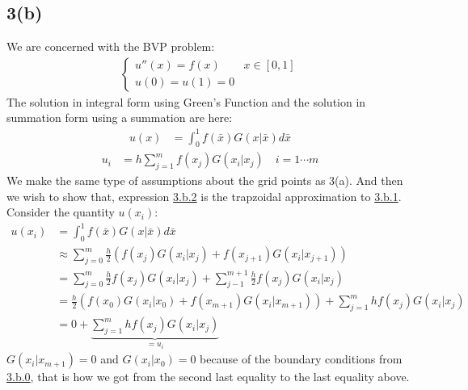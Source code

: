 \documentclass[]{article}
\begin{document}
    \subsection*{3(b)}
        We are concerned with the BVP problem: 
        \begin{align*}\tag{3.b.0}\label{eqn:3.b.0}
            \begin{cases}
                u''(x) = f(x) & x\in[0, 1]
                \\
                u(0) = u(1) =0
            \end{cases}
        \end{align*}
        The solution in integral form using Green's Function and the solution in summation form using a summation are here: 
        \begin{align*}\tag{3.b.1}\label{eqn:3.b.1}
            u(x) &= \int_{0}^{1} 
                f(\bar{x})G(x|\bar{x})
            d\bar{x}
        \end{align*}
        \begin{align*}\tag{3.b.2}\label{eqn:3.b.2}
            u_i &= h \sum_{j = 1}^{m}f(x_j)G(x_i|x_j) \quad i = 1\cdots m
        \end{align*}
        We make the same type of assumptions about the grid points as 3(a). And then we wish to show that, expression \hyperref[eqn:3.b.2]{3.b.2} is the trapzoidal approximation to \hyperref[eqn:3.b.1]{3.b.1}. 
        \\
        Consider the quantity $u(x_i)$: 
        \begin{align*}\tag{3.b.3}\label{eqn:3.b.3}
            u(x_i) &= \int_{0}^{1} 
                f(\bar{x})G(x|\bar{x})
            d\bar{x}
            \\
            & \approx
            \sum_{j = 0}^{m}\frac{h}{2}\left(
                f(x_j)G(x_i|x_j) + f(x_{j + 1})G(x_i| x_{j + 1})
            \right)
            \\
            &= 
            \sum_{j=0}^{m}\frac{h}{2}f(x_j)G(x_i|x_j)
            +
            \sum_{j - 1}^{m + 1}\frac{h}{2}f(x_j)G(x_i|x_j)
            \\
            &= \frac{h}{2}(
                f(x_0)G(x_i|x_0) + f(x_{m + 1})G(x_i|x_{m + 1})
            ) + 
            \sum_{j = 1}^{m}hf(x_j)G(x_i|x_j)
            \\
            &= 
            0 + \underbrace{\sum_{j = 1}^{m}hf(x_j)G(x_i|x_j)}_{= u_i}
        \end{align*}
        $G(x_i|x_{m + 1}) = 0$ and $G(x_i|x_0) = 0$ because of the boundary conditions from \hyperref[eqn:3.b.0]{3.b.0}, that is how we got from the second last equality to the last equality above. 
\end{document}
